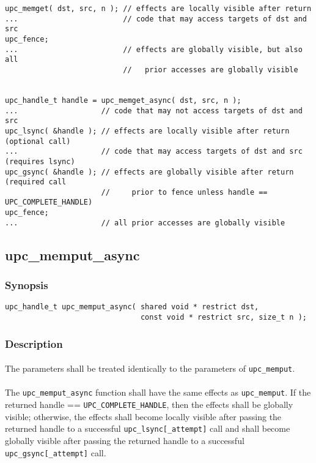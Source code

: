\documentclass[10pt]{article}
\def \memput  {{\tt upc\_memput}}
\def \gsync  {{\tt upc\_gsync[\_attempt]}}
\def \lsync  {{\tt upc\_lsync[\_attempt]}}
\def \complete {{\tt UPC\_COMPLETE\_HANDLE}}
\begin{document}
\begin{verbatim}
upc_memget( dst, src, n ); // effects are locally visible after return
...                        // code that may access targets of dst and src
upc_fence;                 
...                        // effects are globally visible, but also all
                           //   prior accesses are globally visible


upc_handle_t handle = upc_memget_async( dst, src, n );
...                   // code that may not access targets of dst and src
upc_lsync( &handle ); // effects are locally visible after return (optional call)
...                   // code that may access targets of dst and src (requires lsync)
upc_gsync( &handle ); // effects are globally visible after return (required call
                      //     prior to fence unless handle == UPC_COMPLETE_HANDLE)
upc_fence;
...                   // all prior accesses are globally visible
\end{verbatim}

\newpage
\subsection{upc\_memput\_async}
\def\function{{\tt upc\_memput\_async}}

\subsubsection{Synopsis}

\begin{verbatim}
upc_handle_t upc_memput_async( shared void * restrict dst,
                               const void * restrict src, size_t n );
\end{verbatim}

\subsubsection{Description}

\paragraph{} The parameters shall be treated identically to the parameters of
\memput{}.

\paragraph{} The \function{} function shall have the same effects as \memput{}.
If the returned handle == \complete{}, then the effects shall be globally
visible; otherwise, the effects shall become locally visible after passing the
returned handle to a successful \lsync{} call and shall become globally visible
after passing the returned handle to a successful \gsync{} call.
\end{document}

